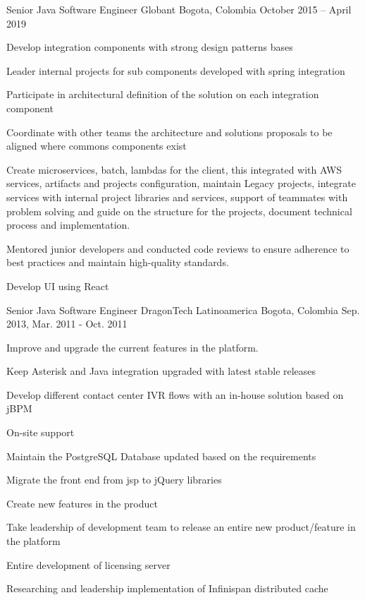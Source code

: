 \begin{cventries}
  \cventry
    {Senior Java Software Engineer} %
    {Globant} %
    {Bogota, Colombia} %
    {October 2015 – April 2019} %
    {
      \begin{cvitems} %
        \item {Develop integration components with strong design patterns bases}
        \item {Leader internal projects for sub components developed with spring integration}
        \item {Participate in architectural definition of the solution on each integration component}
        \item {Coordinate with other teams the architecture and solutions proposals to be aligned where commons components exist}
        \item {}
        \item {Create microservices, batch, lambdas for the client, this integrated with AWS services, artifacts and projects configuration, maintain Legacy projects, integrate services with internal project libraries and services, support of teammates with problem solving and guide on the structure for the projects, document technical process and implementation.}
        \item {Mentored junior developers and conducted code reviews to ensure adherence to best practices and maintain high-quality standards.}
        \item {Develop UI using React}
      \end{cvitems}
    }

  \cventry
    {Senior Java Software Engineer} %
    {DragonTech Latinoamerica} %
    {Bogota, Colombia} %
    {Sep. 2013, Mar. 2011 - Oct. 2011} %
    {
      \begin{cvitems} %
        \item {Improve and upgrade the current features in the platform.}
        \item {Keep Asterisk and Java integration upgraded with latest stable releases}
        \item {Develop different contact center IVR flows with an in-house solution based on jBPM}
        \item {On-site support}
        \item {Maintain the PostgreSQL Database updated based on the requirements}
        \item {Migrate the front end from jsp to jQuery libraries}
        \item {Create new features in the product}
        \item {Take leadership of development team to release an entire new product/feature in the platform}
        \item {Entire development of licensing server}
        \item {Researching and leadership implementation of Infinispan distributed cache}
      \end{cvitems}
    }


\end{cventries}
